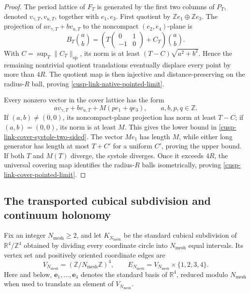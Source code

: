 \documentclass[11pt]{article}
\theoremstyle{definition}
\numberwithin{equation}{section}
\begin{document}
\begin{proof}
The period lattice of \(F_T\) is generated by the first two columns of
\(P_T\), denoted \(v_{\gamma,T},v_{u,T}\), together with \(e_1,e_3\).
First quotient by \(\mathbb Ze_1\oplus\mathbb Ze_3\).  The projection of
\(av_{\gamma,T}+bv_{u,T}\) to the noncompact
\((e_2,e_4)\)-plane is
\[
 B_T\binom ab
 =\left(T\begin{pmatrix}0&1\\-1&0\end{pmatrix}+C_T\right)\binom ab.
\]
With \(C=\sup_T\|C_T\|_{\mathrm{op}}\), its norm is at least
\((T-C)\sqrt{a^2+b^2}\).  Hence the remaining nontrivial quotient
translations eventually displace every point by more than \(4R\).  The
quotient map is then injective and distance-preserving on the radius-\(R\)
ball, proving \eqref{cusp-link-native-pointed-limit}.

Every nonzero vector in the cover lattice has the form
\[
 av_{\gamma,T}+bv_{u,T}+M(pe_1+qe_3),
 \qquad a,b,p,q\in\mathbb Z.
\]
If \((a,b)\ne(0,0)\), its noncompact-plane projection has norm at least
\(T-C\); if \((a,b)=(0,0)\), its norm is at least \(M\).  This gives the
lower bound in \eqref{cusp-link-cover-systole-two-sided}.  The vector
\(Me_1\) has length \(M\), while either long generator has length at most
\(T+C'\) for a uniform \(C'\), proving the upper bound.  If both \(T\) and
\(M(T)\) diverge, the systole diverges.  Once it exceeds \(4R\), the universal
covering map identifies the radius-\(R\) balls isometrically, proving
\eqref{cusp-link-cover-pointed-limit}.
\end{proof}

\subsection{The transported cubical subdivision and continuum holonomy}

Fix an integer \(N_{\mathrm{mesh}}\geq2\), and let
\(K_{N_{\mathrm{mesh}}}\) be the standard cubical subdivision of
\(\mathbb R^4/\mathbb Z^4\) obtained by dividing every coordinate circle
into \(N_{\mathrm{mesh}}\) equal intervals.  Its vertex set and positively
oriented coordinate edges are
\begin{equation}
 V_{N_{\mathrm{mesh}}}
 =(\mathbb Z/N_{\mathrm{mesh}}\mathbb Z)^4,
 \qquad
 E_{N_{\mathrm{mesh}}}
 =V_{N_{\mathrm{mesh}}}\times\{1,2,3,4\}.
 \label{cusp-link-cubical-sets}
\end{equation}
Here and below, \(\mathbf e_1,\ldots,\mathbf e_4\) denotes the standard
basis of \(\mathbb R^4\), reduced modulo \(N_{\mathrm{mesh}}\) when used to
translate an element of \(V_{N_{\mathrm{mesh}}}\).
\end{document}
